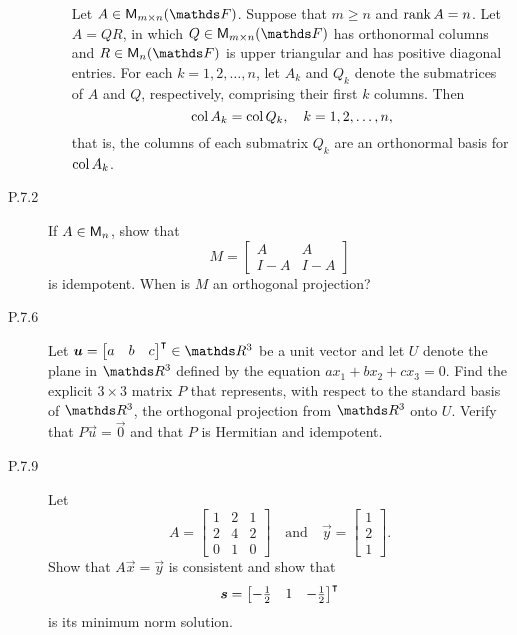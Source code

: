 \documentclass{../homework}
\begin{document}
\begin{description}
\begin{enumerate}
    \begin{bookcorollary}[6.5.15]
      Let \(A \in \M_{m \times n} (\FF)\).  Suppose that \(m \ge n\)
      and \(\operatorname{rank} A = n\).  Let \(A = QR\), in which
      \(Q \in \M_{m \times n} (\FF)\) has orthonormal columns and
      \(R \in \M_n (\FF)\) is upper triangular and has positive
      diagonal entries.  For each \(k = 1, 2, \dots, n\), let \(A_k\)
      and \(Q_k\) denote the submatrices of \(A\) and \(Q\),
      respectively, comprising their first \(k\) columns.  Then
      \[
        \operatorname{col} A_k = \operatorname{col} Q_k, \quad k = 1, 2, \dots, n,
      \]
      that is, the columns of each submatrix \(Q_k\) are an
      orthonormal basis for \(\operatorname{col} A_k\).
    \end{bookcorollary}

    \begin{solution}

    \end{solution}
  \end{enumerate}

\item[P.7.2] If \(A \in \mathsf{M}_n\), show that
  \[
    M =
    \begin{bmatrix}
      A   & A \\
      I-A & I-A
    \end{bmatrix}
  \]
  is idempotent.  When is \(M\) an orthogonal projection?

\item[P.7.6] Let
  \(\vec u = \begin{bmatrix} a & b & c \end{bmatrix}^\transpose \in
  \RR^3\) be a unit vector and let \(U\) denote the plane in \(\RR^3\)
  defined by the equation \(a x_1 + b x_2 + c x_3 = 0\).  Find the
  explicit \(3 \times 3\) matrix \(P\) that represents, with respect
  to the standard basis of \(\RR^3\), the orthogonal projection from
  \(\RR^3\) onto \(U\).  Verify that \(P \vec u = \vec 0\) and that
  \(P\) is Hermitian and idempotent.

  \begin{solution}

  \end{solution}

\item[P.7.9] Let
  \[
    A =
    \begin{bmatrix}
      1 & 2 & 1 \\
      2 & 4 & 2 \\
      0 & 1 & 0
    \end{bmatrix}
    \quad \text{and} \quad
    \vec y =
    \begin{bmatrix}
      1 \\ 2 \\ 1
    \end{bmatrix}.
  \]
  Show that \(A \vec x = \vec y\) is consistent and show that
  \[
    \vec s =
    \begin{bmatrix}
      -\frac 1 2 & 1 & -\frac 1 2
    \end{bmatrix}^\transpose
  \]
  is its minimum norm solution.


\end{description}
\end{document}
